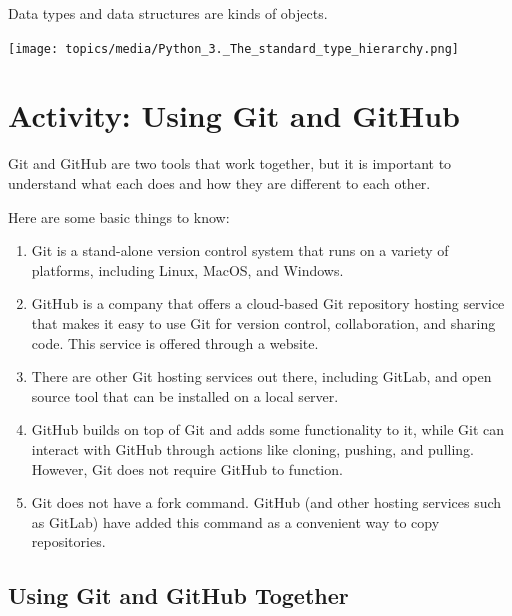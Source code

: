 \documentclass[
  letterpaper,
  DIV=11,
  numbers=noendperiod]{scrreport}
\providecommand{\tightlist}{%
  \setlength{\itemsep}{0pt}\setlength{\parskip}{0pt}}\usepackage{longtable,booktabs,array}
\begin{document}
Data types and data structures are kinds of objects.

\texttt{[image: topics/media/Python\_3.\_The\_standard\_type\_hierarchy.png]}

\hypertarget{activity-using-git-and-github}{%
\chapter{Activity: Using Git and
GitHub}\label{activity-using-git-and-github}}

Git and GitHub are two tools that work together, but it is important to
understand what each does and how they are different to each other.

Here are some basic things to know:

\begin{enumerate}
\def\labelenumi{\arabic{enumi}.}
\tightlist
\item
  Git is a stand-alone version control system that runs on a variety of
  platforms, including Linux, MacOS, and Windows.
\item
  GitHub is a company that offers a cloud-based Git repository hosting
  service that makes it easy to use Git for version control,
  collaboration, and sharing code. This service is offered through a
  website.
\item
  There are other Git hosting services out there, including GitLab, and
  open source tool that can be installed on a local server.
\item
  GitHub builds on top of Git and adds some functionality to it, while
  Git can interact with GitHub through actions like cloning, pushing,
  and pulling. However, Git does not require GitHub to function.
\item
  Git does not have a fork command. GitHub (and other hosting services
  such as GitLab) have added this command as a convenient way to copy
  repositories.
\end{enumerate}

\hypertarget{using-git-and-github-together}{%
\section{Using Git and GitHub
Together}\label{using-git-and-github-together}}
\end{document}
